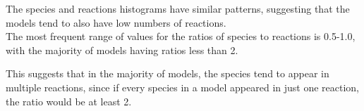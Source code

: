 \documentclass[portrait,a1paper,fontscale=0.46]{baposter}
\begin{document}
\begin{poster}
{\begin{multicols}{2}
  The species and reactions histograms have similar patterns, suggesting that the models tend to also have low numbers of reactions. \\
   
 The most frequent range of values for the ratios of species to reactions is 0.5-1.0, with the majority of models having ratios less than 2.
 
 This suggests that in the majority of models, the species tend to appear in multiple reactions, since if every species in a model appeared in just one reaction, the ratio would be at least 2.
 
 \end{multicols}
 }
 
\end{poster}
\end{document}
